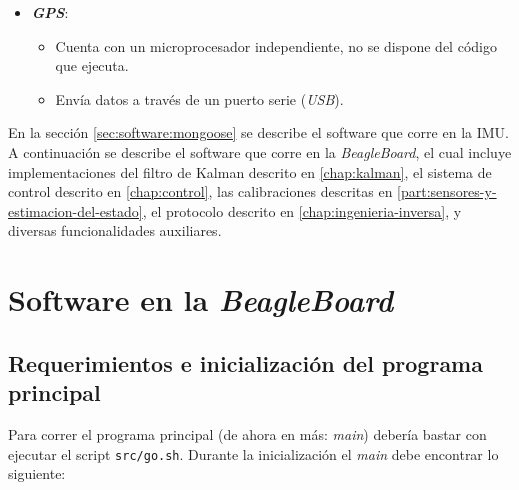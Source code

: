 \documentclass[main]{subfiles}
\begin{document}
\begin{itemize}
\begin{itemize}
  \item Se programa en \textit{Arduino}, un lenguaje muy similar a \verb+C+, con algunas simplificaciones.
  \item Lee datos de los sensores y se comunica mediante un puerto serie.
  \item El c\'odigo est\'a fuertemente basado en el que ven\'ia con la IMU, fue modificado para adecuarlo a las necesidades del proyecto.
  \end{itemize}
\item \textbf{\textit{GPS}}:
  \begin{itemize}
  \item Cuenta con un microprocesador independiente, no se dispone del c\'odigo que ejecuta.
  \item Env\'ia datos a trav\'es de un puerto serie (\textit{USB}).
  \end{itemize}
\end{itemize}

En la secci\'on \ref{sec:software:mongoose} se describe el software que corre en la IMU. A continuaci\'on se describe el software que corre en la \textit{BeagleBoard}, el cual incluye implementaciones del filtro de Kalman descrito en \ref{chap:kalman}, el sistema de control descrito en \ref{chap:control}, las calibraciones descritas en \ref{part:sensores-y-estimacion-del-estado}, el protocolo descrito en \ref{chap:ingenieria-inversa}, y diversas funcionalidades auxiliares.

\section{Software en la \textit{BeagleBoard}}

\subsection{Requerimientos e inicializaci\'on del programa principal}
\label{sec:software-init}

Para correr el programa principal (de ahora en más: \textit{main}) deber\'ia bastar con ejecutar el script \verb+src/go.sh+. Durante la inicializaci\'on el \textit{main} debe encontrar lo siguiente:\newline
\vspace{-20pt}
\end{document}
